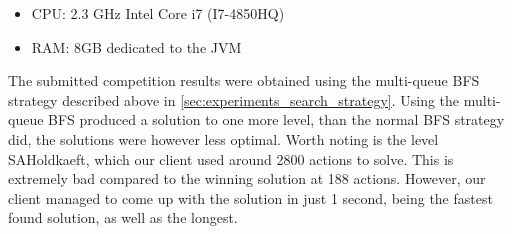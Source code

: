 \documentclass[Main]{subfiles}
\begin{document}
\begin{itemize}
\item CPU: 2.3 GHz Intel Core i7 (I7-4850HQ) 
\item RAM: 8GB dedicated to the JVM
\end{itemize}


The submitted competition results were obtained using the multi-queue BFS strategy described above in \autoref{sec:experiments_search_strategy}. Using the multi-queue BFS produced a solution to one more level, than the normal BFS strategy did, the solutions were however less optimal. Worth noting is the level SAHoldkaeft, which our client used around 2800 actions to solve. This is extremely bad compared to the winning solution at 188 actions. However, our client managed to come up with the solution in just 1 second, being the fastest found solution, as well as the longest. 
\end{document}
